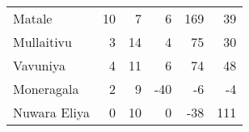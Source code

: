 \begin{tabular}{lrrrrr}
Matale       &          10 &           7 &            6 &              169 &          39 \\
Mullaitivu   &           3 &          14 &            4 &               75 &          30 \\
Vavuniya     &           4 &          11 &            6 &               74 &          48 \\
Moneragala   &           2 &           9 &          -40 &               -6 &          -4 \\
Nuwara Eliya &           0 &          10 &            0 &              -38 &         111 \\
\bottomrule
\end{tabular}
